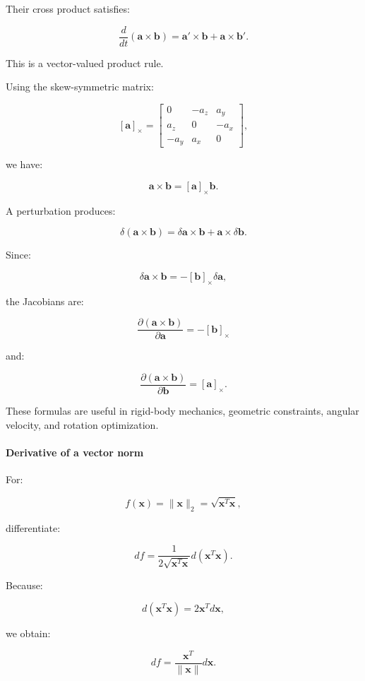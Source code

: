 Their cross product satisfies:

\[
\frac d{dt}(\mathbf a\times\mathbf b) = \mathbf a'\times\mathbf b+ \mathbf a\times\mathbf b'.
\]

This is a vector-valued product rule.

Using the skew-symmetric matrix:

\[
[\mathbf a]_\times= \begin{bmatrix} 0&-a_z&a_y\\ a_z&0&-a_x\\ -a_y&a_x&0 \end{bmatrix},
\]

we have:

\[
\mathbf a\times\mathbf b=[\mathbf a]_\times\mathbf b.
\]

A perturbation produces:

\[
\delta(\mathbf a\times\mathbf b) = \delta\mathbf a\times\mathbf b+ \mathbf a\times\delta\mathbf b.
\]

Since:

\[
\delta\mathbf a\times\mathbf b = -[\mathbf b]_\times\delta\mathbf a,
\]

the Jacobians are:

\[
\boxed{ \frac{\partial(\mathbf a\times\mathbf b)}{\partial\mathbf a} = -[\mathbf b]_\times }
\]

and:

\[
\boxed{ \frac{\partial(\mathbf a\times\mathbf b)}{\partial\mathbf b} = [\mathbf a]_\times }.
\]

These formulas are useful in rigid-body mechanics, geometric constraints, angular velocity, and rotation optimization.

\paragraph{Derivative of a vector norm}\label{02-foundations-ii-ch027-derivative-of-a-vector-norm}

For:

\[
f(\mathbf x)=\|\mathbf x\|_2 = \sqrt{\mathbf x^T\mathbf x},
\]

differentiate:

\[
df= \frac1{2\sqrt{\mathbf x^T\mathbf x}} d(\mathbf x^T\mathbf x).
\]

Because:

\[
d(\mathbf x^T\mathbf x)=2\mathbf x^Td\mathbf x,
\]

we obtain:

\[
df= \frac{\mathbf x^T}{\|\mathbf x\|}d\mathbf x.
\]

